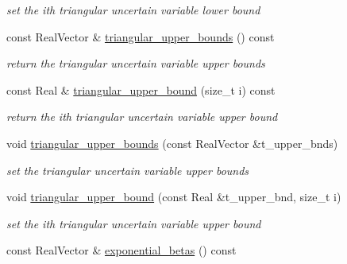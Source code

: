 \begin{DoxyCompactItemize}
\begin{DoxyCompactList}\small\item\em set the ith triangular uncertain variable lower bound \end{DoxyCompactList}\item 
const Real\+Vector \& \hyperlink{classPecos_1_1AleatoryDistParams_ad6ed4b51a6568ce9838faa46db9e9d09}{triangular\+\_\+upper\+\_\+bounds} () const \label{classPecos_1_1AleatoryDistParams_ad6ed4b51a6568ce9838faa46db9e9d09}

\begin{DoxyCompactList}\small\item\em return the triangular uncertain variable upper bounds \end{DoxyCompactList}\item 
const Real \& \hyperlink{classPecos_1_1AleatoryDistParams_abfee2cd9816da49a4d108669458d3827}{triangular\+\_\+upper\+\_\+bound} (size\+\_\+t i) const \label{classPecos_1_1AleatoryDistParams_abfee2cd9816da49a4d108669458d3827}

\begin{DoxyCompactList}\small\item\em return the ith triangular uncertain variable upper bound \end{DoxyCompactList}\item 
void \hyperlink{classPecos_1_1AleatoryDistParams_a86c0c7e3ea3c27734a1bb4d4901ddba4}{triangular\+\_\+upper\+\_\+bounds} (const Real\+Vector \&t\+\_\+upper\+\_\+bnds)\label{classPecos_1_1AleatoryDistParams_a86c0c7e3ea3c27734a1bb4d4901ddba4}

\begin{DoxyCompactList}\small\item\em set the triangular uncertain variable upper bounds \end{DoxyCompactList}\item 
void \hyperlink{classPecos_1_1AleatoryDistParams_a5643de59c305266b73887e383607d57e}{triangular\+\_\+upper\+\_\+bound} (const Real \&t\+\_\+upper\+\_\+bnd, size\+\_\+t i)\label{classPecos_1_1AleatoryDistParams_a5643de59c305266b73887e383607d57e}

\begin{DoxyCompactList}\small\item\em set the ith triangular uncertain variable upper bound \end{DoxyCompactList}\item 
const Real\+Vector \& \hyperlink{classPecos_1_1AleatoryDistParams_a9c0c5169a0510d5d0774751c26289b35}{exponential\+\_\+betas} () const \label{classPecos_1_1AleatoryDistParams_a9c0c5169a0510d5d0774751c26289b35}


\end{DoxyCompactItemize}
